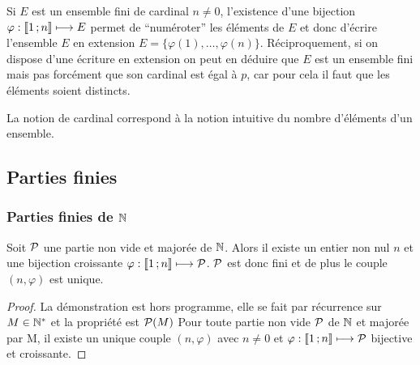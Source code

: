 Si \(E\) est un ensemble fini de cardinal \(n\neq 0\), l'existence d'une bijection \(\varphi:\intervalleentier{1}{n} \longmapsto E\) permet de ``numéroter'' les éléments de \(E\) et donc d'écrire l'ensemble \(E\) en extension \(E=\{\varphi(1), \ldots, \varphi(n)\}\).
Réciproquement, si on dispose d'une écriture en extension on peut en déduire que \(E\) est un ensemble fini mais pas forcément que son cardinal est égal à \(p\), car pour cela il faut que les éléments soient distincts.

La notion de cardinal correspond à la notion intuitive du nombre d'éléments d'un ensemble.

\subsection{Parties finies}

\subsubsection{Parties finies de \(\N\)}

\begin{theo}\label{theo:partfinN}
  Soit \(\P\) une partie non vide et majorée de \(\N\). Alors il existe un entier non nul \(n\) et une bijection croissante \(\varphi:\intervalleentier{1}{n} \longmapsto \P\). \(\P\) est donc fini et de plus le couple \((n,\varphi)\) est unique.
\end{theo}
\begin{proof}
  La démonstration est hors programme, elle se fait par récurrence sur \(M\in\N^*\) et la propriété est \(\P(M)\) Pour toute partie non vide \(\P\) de \(\N\) et majorée par M, il existe un unique couple \((n,\varphi)\) avec \(n\neq 0\) et \(\varphi:\intervalleentier{1}{n} \longmapsto \P\) bijective et croissante. 
\end{proof}

